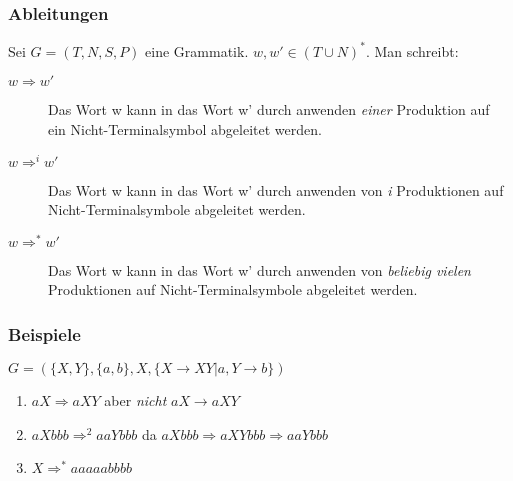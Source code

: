\begin{frame}
  \frametitle{Ableitungen}
  \begin{definition}
    Sei $G = (T, N, S, P)$ eine Grammatik. $w, w' \in (T \cup N)^*$.
    Man schreibt:
    \begin{description}
      \item[$w \Longrightarrow w'$] Das Wort w kann in das Wort w' durch anwenden
        \emph{einer} Produktion auf ein Nicht-Terminalsymbol abgeleitet werden.
      \item[$w \Longrightarrow^i w'$] Das Wort w kann in das Wort w' durch anwenden von
        \emph{i} Produktionen auf Nicht-Terminalsymbole abgeleitet werden.
      \item[$w \Longrightarrow^* w'$] Das Wort w kann in das Wort w' durch anwenden von
        \emph{beliebig vielen} Produktionen auf Nicht-Terminalsymbole abgeleitet werden.
    \end{description}
  \end{definition}
\end{frame}

\begin{frame}
  \frametitle{Beispiele}
    $G = (\{X, Y\}, \{a, b\}, X, \{X \longrightarrow XY | a, Y \longrightarrow b\})$
  \begin{exampleblock}{}
    \begin{enumerate}
      \item $aX \Longrightarrow aXY$ aber \emph{nicht} $aX \longrightarrow aXY$
      \item $aXbbb \Longrightarrow^2 aaYbbb$ da $aXbbb \Longrightarrow aXYbbb \Longrightarrow aaYbbb$
      \item $ X \Longrightarrow^* aaaaabbbb$
    \end{enumerate}
  \end{exampleblock}
\end{frame}

